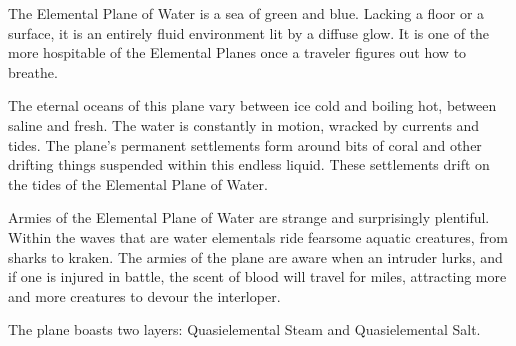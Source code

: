 The Elemental Plane of Water is a sea of green and blue. Lacking a floor or a surface, it is an entirely fluid environment lit by a diffuse glow. It is one of the more hospitable of the Elemental Planes once a traveler figures out how to breathe.

The eternal oceans of this plane vary between ice cold and boiling hot, between saline and fresh. The water is constantly in motion, wracked by currents and tides. The plane's permanent settlements form around bits of coral and other drifting things suspended within this endless liquid. These settlements drift on the tides of the Elemental Plane of Water.

Armies of the Elemental Plane of Water are strange and surprisingly plentiful. Within the waves that are water elementals ride fearsome aquatic creatures, from sharks to kraken. The armies of the plane are aware when an intruder lurks, and if one is injured in battle, the scent of blood will travel for miles, attracting more and more creatures to devour the interloper.

The plane boasts two layers: Quasielemental Steam and Quasielemental Salt.

\begin{figure}[h!]
\centering
{}
\end{figure}

